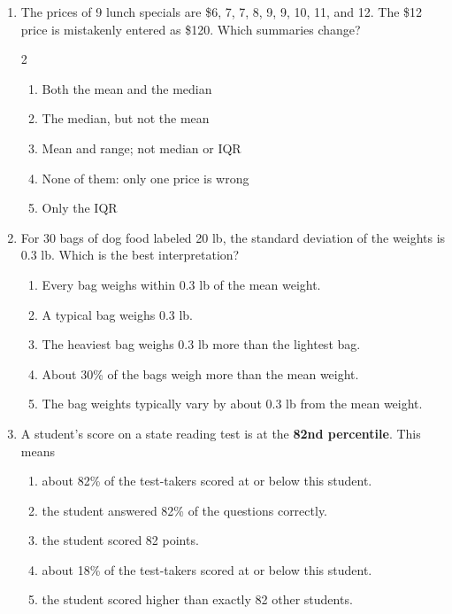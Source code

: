 \documentclass[12pt]{article}
\newenvironment{choices}
  {\begin{enumerate}[label=\textbf{(\Alph*)}, leftmargin=2.2em, itemsep=0pt, topsep=1pt]}
  {\end{enumerate}}
\newcommand{\letterroom}{\rule[-15pt]{0pt}{36pt}}
\begin{document}
\begin{enumerate}[leftmargin=1.9em, itemsep=0.03in]
  \boxguard[10]
  \item The prices of 9 lunch specials are \$6, 7, 7, 8, 9, 9, 10, 11, and 12. The \$12 price is
        mistakenly entered as \$120. Which summaries change?
        \begin{multicols}{2}
        \begin{choices}
          \item Both the mean and the median
          \item The median, but not the mean
          \item Mean and range; not median or IQR
          \item None of them: only one price is wrong
          \item Only the IQR
                \hfill{}\letterroom
        \end{choices}
        \end{multicols}

  \boxguard[10]
  \item For 30 bags of dog food labeled 20 lb, the standard deviation of the weights is 0.3 lb.
        Which is the best interpretation?
        \begin{choices}
          \item Every bag weighs within 0.3 lb of the mean weight.
          \item A typical bag weighs 0.3 lb.
          \item The heaviest bag weighs 0.3 lb more than the lightest bag.
          \item About 30\% of the bags weigh more than the mean weight.
          \item The bag weights typically vary by about 0.3 lb from the mean weight.
                \hfill{}\letterroom
        \end{choices}

  \boxguard[10]
  \item A student's score on a state reading test is at the \textbf{82nd percentile}. This means
        \begin{choices}
          \item about 82\% of the test-takers scored at or below this student.
          \item the student answered 82\% of the questions correctly.
          \item the student scored 82 points.
          \item about 18\% of the test-takers scored at or below this student.
          \item the student scored higher than exactly 82 other students.
                \hfill{}\letterroom
        \end{choices}


\end{enumerate}
\end{document}
